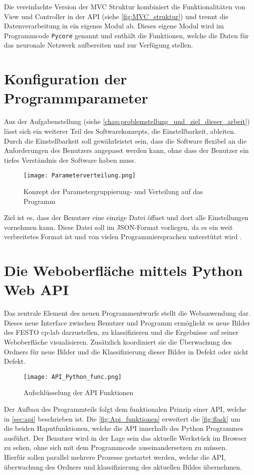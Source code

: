 Die vereinfachte Version der \ac{MVC} Struktur kombiniert die Funktionalitäten von View und Controller in der \ac{API} (siehe \autoref{fig:MVC_struktur}) und trennt die Datenverarbeitung in ein eigenes Modul ab. Dieses eigene Modul wird im Programmcode \texttt{Pycore} genannt und enthält die Funktionen, welche die Daten für das neuronale Netzwerk aufbereiten und zur Verfügung stellen.

\section{Konfiguration der Programmparameter} \label{sec:konfiguration}

Aus der Aufgabenstellung (siehe \autoref{chap:problemstellung_und_ziel_dieser_arbeit}) lässt sich ein weiterer Teil des Softwarekonzepts, die Einstellbarkeit, ableiten.
Durch die Einstellbarkeit soll gewährleistet sein, dass die Software flexibel an die Anforderungen des Benutzers angepasst werden kann, ohne dass der Benutzer ein tiefes Verständnis der Software haben muss.

\begin{figure}[H]
    \centering
    \texttt{[image: Parameterverteilung.png]}
    \caption{Konzept der Parametergruppierung- und Verteilung auf das Programm} 
    \label{fig:json_example}
\end{figure}

Ziel ist es, dass der Benutzer eine einzige Datei öffnet und dort alle Einstellungen vornehmen kann. 
Diese Datei soll im \ac{JSON}-Format vorliegen, da es ein weit verbreitetes Format ist und von vielen Programmiersprachen unterstützt wird \cite{gur_diskussion_2024}.


\section{Die Weboberfläche mittels Python Web API} \label{sec:weboberflaeche}

Das zentrale Element des neuen Programmentwurfs stellt die Webanwendung dar. Dieses neue Interface zwischen Benutzer und Programm ermöglicht es neue Bilder des FESTO \ac{cp-lab} darzustellen, zu klassifizieren und die Ergebnisse auf seiner Weboberfläche visualisieren.
Zusätzlich koordiniert sie die Überwachung des Ordners für neue Bilder und die Klassifizierung dieser Bilder in Defekt oder nicht Defekt.

\begin{figure}[H]
    \centering
    \texttt{[image: API\_Python\_func.png]}
    \caption{Aufschlüsselung der API Funktionen} 
    \label{fig:Api_funktionen}
\end{figure}

Der Aufbau des Programmteils folgt dem funktionalen Prinzip einer \ac{API}, welche in \autoref{sec:api} beschrieben ist. Die \autoref{fig:Api_funktionen} erweitert die \autoref{fig:flask} um die beiden Haputfunktionen, welche die API innerhalb des Python Programmes ausführt. Der Benutzer wird in der Lage sein das aktuelle Werkstück im Browser zu sehen, ohne sich mit dem Programmcode auseinandersetzen zu müssen. Hierfür sollen parallel mehrere Prozesse gestartet werden, welche die API, überwachung des Ordners und klassifizierung des aktuellen Bildes übernehmen.